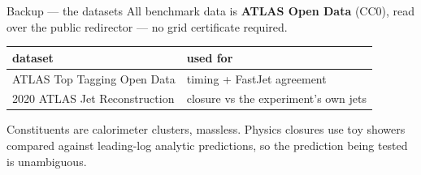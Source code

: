 \documentclass[aspectratio=169,10pt]{beamer}
\newcommand{\smallnote}[1]{{\footnotesize\color{fjgray} #1}}
\begin{document}
\begin{frame}{Backup --- the datasets}
All benchmark data is \textbf{ATLAS Open Data} (CC0), read over the public
redirector --- no grid certificate required.
\medskip

\begin{center}
\begin{tabular}{@{}ll@{}}
\toprule
dataset & used for\\
\midrule
ATLAS Top Tagging Open Data & timing + FastJet agreement\\
2020 ATLAS Jet Reconstruction & closure vs the experiment's own jets\\
\bottomrule
\end{tabular}
\end{center}
\medskip

\smallnote{Constituents are calorimeter clusters, massless. Physics closures use
toy showers compared against leading-log analytic predictions, so the prediction
being tested is unambiguous.}
\end{frame}
\end{document}
